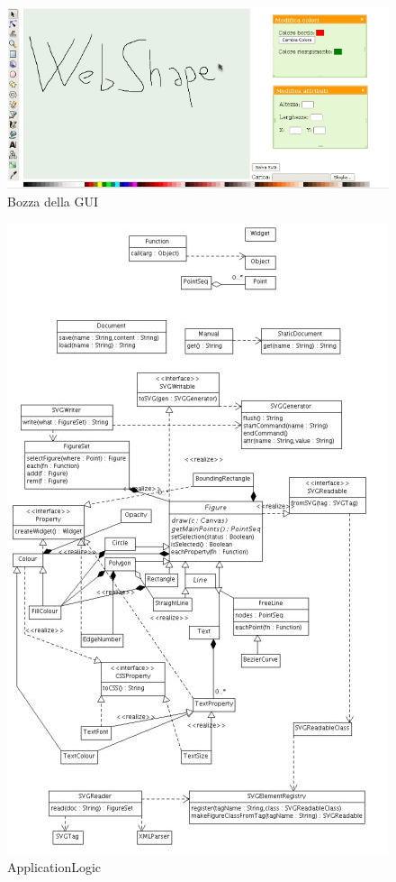 \begin{figure}[!ht]
\centering
\includegraphics{bozzaGUI.jpg}
\caption{Bozza della GUI}
\end{figure}

\newpage
{}

\begin{figure}[!ht]
\centering
\includegraphics{applogic.jpg}
\caption{ApplicationLogic}
\end{figure}

